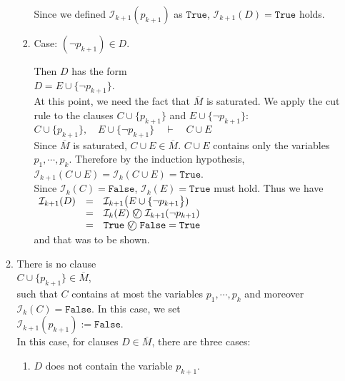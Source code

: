 \begin{enumerate}
\begin{enumerate}
\begin{enumerate}[1.]
          Since we defined $\mathcal{I}_{k+1}(p_{k+1})$ as $\texttt{True}$, $\mathcal{I}_{k+1}(D) = \mathtt{True}$ holds.
    \item Case: $(\neg p_{k+1}) \in D$.

          Then $D$ has the form
          \\[0.2cm]
          \hspace*{1.3cm}
          $D = E \cup \{ \neg p_{k+1} \}$.
          \\[0.2cm]
          At this point, we need the fact that $\overline{M}$ is saturated. We apply the
          cut rule to the clauses $C \cup \{ p_{k+1} \}$ and $E \cup \{ \neg p_{k+1} \}$:
          \\[0.2cm]
          \hspace*{1.3cm}
          $C \cup \{ p_{k+1} \},\quad E \cup \{ \neg p_{k+1} \} \quad\vdash\quad C \cup E$
          \\[0.2cm]
          Since $\overline{M}$ is saturated, $C\cup E \in \overline{M}$. $C \cup E$ contains only the
          variables $p_1,\cdots, p_k$. Therefore by the induction hypothesis,
          \\[0.2cm]
          \hspace*{1.3cm}
          $\mathcal{I}_{k+1}(C \cup E) = \mathcal{I}_{k}(C \cup E) = \mathtt{True}$.
          \\[0.2cm]
          Since $\mathcal{I}_k(C) = \mathtt{False}$, $\mathcal{I}_k(E) = \mathtt{True}$ must hold. Thus
          we have
          \\[0.2cm]
          \hspace*{1.3cm}
          $
          \begin{array}[t]{lcl}
            \mathcal{I}_{k+1}(D) & = & \mathcal{I}_{k+1}\bigl(E \cup \{ \neg p_{k+1} \bigr\}) \\
                                & = & \mathcal{I}_k(E) \;\circvee\;\; \mathcal{I}_{k+1}(\neg p_{k+1}) \\
                                & = & \mathtt{True} \;\circvee\;\; \mathtt{False} = \mathtt{True}
          \end{array}
          $
          \\[0.2cm]
          and that was to be shown.
    \end{enumerate}
  \item There is no clause
    \\[0.2cm]
    \hspace*{1.3cm}
    $C \cup \{p_{k+1}\} \in \overline{M}$,
    \\[0.2cm]
    such that $C$ contains at most the variables $p_1,\cdots,p_k$ and moreover $\mathcal{I}_k(C) = \mathtt{False}$.
    In this case, we set
    \\[0.2cm]
    \hspace*{1.3cm}
    $\mathcal{I}_{k+1}(p_{k+1}) := \mathtt{False}$.
    \\[0.2cm]    
    In this case, for clauses $D \in \overline{M}$, there are three cases:
    \begin{enumerate}[1.]
    \item $D$ does not contain the variable $p_{k+1}$.
      

\end{enumerate}
\end{enumerate}
\end{enumerate}

